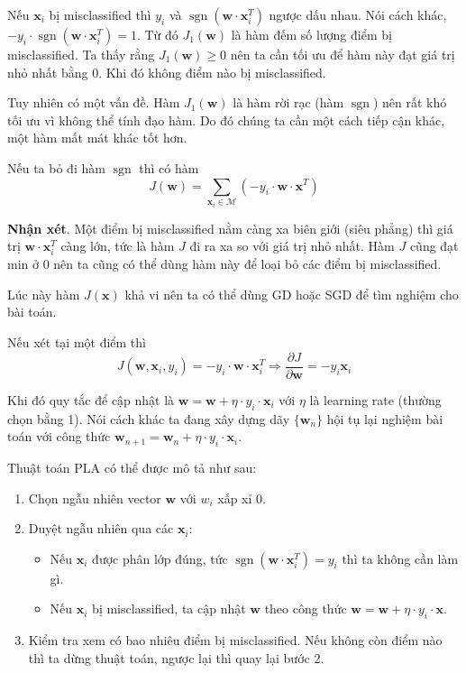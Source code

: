 \documentclass{mynotes}
\DeclareMathOperator{\sgn}{sgn}
\begin{document}
Nếu $\bm{x}_i$ bị misclassified thì $y_i$ và $\sgn (\bm{w} \cdot \bm{x}_i^T)$ ngược dấu nhau. Nói cách khác, $-y_i \cdot \sgn (\bm{w} \cdot \bm{x}_i^T) = 1$. Từ đó $J_1(\bm{w})$ là hàm đếm số lượng điểm bị misclassified. Ta thấy rằng $J_1(\bm{w}) \geq 0$ nên ta cần tối ưu để hàm này đạt giá trị nhỏ nhất bằng 0. Khi đó không điểm nào bị misclassified.

Tuy nhiên có một vấn đề. Hàm $J_1(\bm{w})$ là hàm rời rạc (hàm $\sgn$) nên rất khó tối ưu vì không thể tính đạo hàm. Do đó chúng ta cần một cách tiếp cận khác, một hàm mất mát khác tốt hơn.

Nếu ta bỏ đi hàm $\sgn$ thì có hàm \[ J(\bm{w}) = \sum_{\bm{x}_i \in \mathcal{M}} (-y_i \cdot \bm{w} \cdot \bm{x}^T) \]

\textbf{Nhận xét}. Một điểm bị misclassified nằm càng xa biên giới (siêu phẳng) thì giá trị $\bm{w} \cdot \bm{x}_i^T$ càng lớn, tức là hàm $J$ đi ra xa so với giá trị nhỏ nhất. Hàm $J$ cũng đạt min ở 0 nên ta cũng có thể dùng hàm này để loại bỏ các điểm bị misclassified.

Lúc này hàm $J(\bm{x})$ khả vi nên ta có thể dùng GD hoặc SGD để tìm nghiệm cho bài toán.

Nếu xét tại một điểm thì \[ J(\bm{w}, \bm{x}_i, y_i) = -y_i \cdot \bm{w} \cdot \bm{x}_i^T \Rightarrow \dfrac{\partial J}{\partial \bm{w}} = -y_i \bm{x}_i \]

Khi đó quy tắc để cập nhật là $\bm{w} = \bm{w} + \eta \cdot y_i \cdot \bm{x}_i$ với $\eta$ là learning rate (thường chọn bằng 1). Nói cách khác ta đang xây dựng dãy $\{ \bm{w}_n \}$ hội tụ lại nghiệm bài toán với công thức $\bm{w}_{n+1} = \bm{w}_n + \eta \cdot y_i \cdot \bm{x}_i$.

Thuật toán PLA có thể được mô tả như sau:

\begin{enumerate}
    \item Chọn ngẫu nhiên vector $\bm{w}$ với $w_i$ xấp xỉ 0.
    \item Duyệt ngẫu nhiên qua các $\bm{x}_i$:
    \begin{itemize}
        \item Nếu $\bm{x}_i$ được phân lớp đúng, tức $\sgn(\bm{w} \cdot \bm{x}_i^T) = y_i$ thì ta không cần làm gì.
        \item Nếu $\bm{x}_i$ bị misclassified, ta cập nhật $\bm{w}$ theo công thức $\bm{w} = \bm{w} + \eta \cdot y_i \cdot \bm{x}$.
    \end{itemize}
    \item Kiểm tra xem có bao nhiêu điểm bị misclassified. Nếu không còn điểm nào thì ta dừng thuật toán, ngược lại thì quay lại bước 2.
\end{enumerate}

\printbibliography
\end{document}
